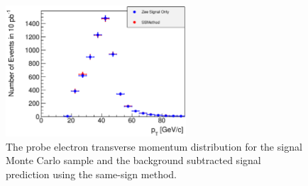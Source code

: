 \documentclass{cmspaper}
\begin{document}
\begin{figure}[htb]
  \begin{center}
    \includegraphics[width=0.6\textwidth]{plots/Efficiency_Isolation_Denominator_Pt_SSMethod.eps}
    \caption{The probe electron transverse momentum distribution for the signal Monte Carlo sample and the background subtracted signal prediction using the same-sign method. }
    \label{fig:probept_signalMCVsSSMethod}
  \end{center}
\end{figure}


\end{document}
